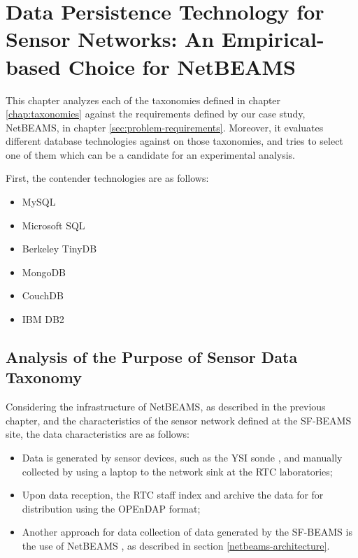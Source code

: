 

\chapter{Data Persistence Technology for Sensor Networks: An Empirical-based
Choice for NetBEAMS}

This chapter analyzes each of the taxonomies defined in chapter
\ref{chap:taxonomies} against the requirements defined by our case study,
NetBEAMS, in chapter \ref{sec:problem-requirements}. Moreover, it evaluates
different database technologies against on those taxonomies, and tries to select
one of them which can be a candidate for an experimental analysis.

First, the contender technologies are as follows:

\begin{itemize}
  \item MySQL
  \item Microsoft SQL 
  \item Berkeley TinyDB
  \item MongoDB
  \item CouchDB
  \item IBM DB2
\end{itemize}

\section{Analysis of the Purpose of Sensor Data Taxonomy}

Considering the infrastructure of NetBEAMS, as described in the previous
chapter, and the characteristics of the sensor network defined at the SF-BEAMS
\cite{sfbeams2006} site, the data characteristics are as follows:

\begin{itemize}
  \item Data is generated by sensor devices, such as the YSI sonde
  \cite{YSI-Sonde}, and manually collected by using a laptop to the network
  sink at the RTC laboratories;
  \item Upon data reception, the RTC staff index and archive the data for
  for distribution using the OPEnDAP format;
  \item Another approach for data collection of data generated by the SF-BEAMS
  is the use of NetBEAMS \cite{netbeams2009}, as described in section
  \ref{netbeams-architecture}.
\end{itemize}

